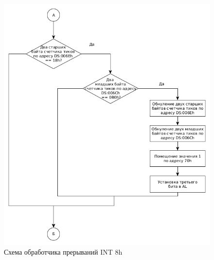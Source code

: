 \begin{figure}[ht!]
	\begin{center}
		\includegraphics[scale=0.7]{img/int8h_02}
	\end{center}
	\captionsetup{justification=centering}
	\caption{Схема обработчика прерываний INT 8h}
	\label{img:i2}
\end{figure}
\FloatBarrier

